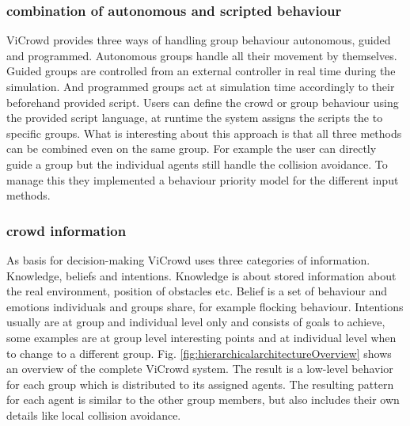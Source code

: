 \documentclass{acmsiggraph}               %
\begin{document}
\subsubsection{combination of autonomous and scripted behaviour}
ViCrowd provides three ways of handling group behaviour autonomous, guided and programmed. 
Autonomous groups handle all their movement by themselves. Guided groups are controlled from an external controller in real time during the simulation. And programmed groups act at simulation time accordingly to their beforehand provided script. Users can define the crowd or group behaviour using the provided script language, at runtime the system assigns the scripts the to specific groups. 
What is interesting about this approach is that all three methods can be combined even on the same group. For example the user can directly guide a group but the individual agents still handle the collision avoidance. To manage this they implemented a behaviour priority model for the different input methods.
\subsubsection{crowd information}
As basis for decision-making ViCrowd uses three categories of information. Knowledge, beliefs and intentions. 
Knowledge is about stored information about the real environment, position of obstacles etc. 
Belief is a set of behaviour and emotions individuals and groups share, for example flocking behaviour.
Intentions usually are at group and individual level only and consists of goals to achieve, some examples are at group level interesting points and at individual level when to change to a different group.
Fig. \ref{fig:hierarchicalarchitectureOverview} shows an overview of the complete ViCrowd system. The result is a low-level behavior for each group which is distributed to its assigned agents. The resulting pattern for each agent is similar to the other group members, but also includes their own details like local collision avoidance.
\end{document}
